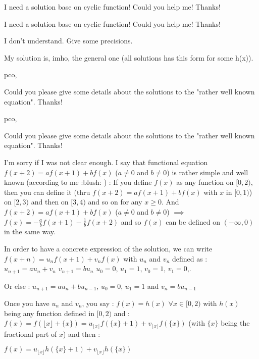 \begin{mysolution}
	I need a solution base on cyclic function! Could you help me! Thanks!
\end{mysolution}



\begin{mysolution}
	\begin{tcolorbox}I need a solution base on cyclic function! Could you help me! Thanks!\end{tcolorbox}

I don't understand. Give some precisions.

My solution is, imho, the general one (all solutions has this form for some h(x)).
\end{mysolution}



\begin{mysolution}
	pco,

Could you please give some details about the solutions to the "rather well known equation". Thanks!
\end{mysolution}



\begin{mysolution}
	\begin{tcolorbox}pco,

Could you please give some details about the solutions to the "rather well known equation". Thanks!\end{tcolorbox}

I'm sorry if I was not clear enough.
I say that functional equation $f(x+2)=af(x+1)+bf(x)$ ($a\neq0$ and $b\neq 0$) is rather simple and well known (according to me  :blush: ) :
If you define $f(x)$ as any function on $[0,2)$, then you can define it (thru $f(x+2)=af(x+1)+bf(x)$ with $x$ in $[0,1)$) on $[2,3)$ and then on $[3,4)$ and so on for any $x\geq 0$.
And $f(x+2)=af(x+1)+bf(x)$ ($a\neq0$ and $b\neq 0$) $\implies$ $f(x)=-\frac{a}{b}f(x+1)-\frac{1}{b}f(x+2)$ and so $f(x)$ can be defined on $(-\infty,0)$ in the same way.

In order to have a concrete expression of the solution, we can write $f(x+n)=u_{n}f(x+1)+v_{n}f(x)$ with $u_{n}$ and $v_{n}$ defined as :
$u_{n+1}=au_{n}+v_{n}$
$v_{n+1}=bu_{n}$
$u_{0}=0$, $u_{1}=1$, $v_{0}=1$, $v_{1}=0$,.

Or else :
$u_{n+1}=au_{n}+bu_{n-1}$, $u_{0}=0$, $u_{1}=1$ and $v_{n}=bu_{n-1}$

Once you have $u_{n}$ and $v_{n}$, you say :
$f(x)=h(x)$ $\forall x\in[0,2)$ with $h(x)$ being any function defined in $[0,2)$ and :
$f(x)=f( \lfloor x \rfloor+\{x\})=u_{ \lfloor x \rfloor }f(\{x\}+1)+v_{ \lfloor x \rfloor }f(\{x\})$ (with $\{x\}$ being the fractional part of $x$) and then :


$f(x)=u_{ \lfloor x \rfloor }h(\{x\}+1)+v_{ \lfloor x \rfloor }h(\{x\})$
\end{mysolution}



